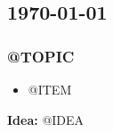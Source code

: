 \begin{center}
\section*{\creationmonth}
\end{center}

\subsection*{\monthdayyeardate\today}
\subsubsection*{@TOPIC}
\begin{itemize}
    \item @ITEM
\end{itemize}
\textbf{Idea:} @IDEA\\
